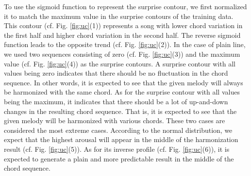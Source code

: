 \documentclass{article}
\begin{document}
To use the sigmoid function to represent the surprise contour, we first normalized it to match the maximum value in the surprise contours of the training data. This contour (cf. Fig. \ref{fig:uc}(1)) represents a song with lower chord variation in the first half and higher chord variation in the second half. The reverse sigmoid function leads to the opposite trend (cf. Fig. \ref{fig:uc}(2)). In the case of plain line, we used two sequences consisting of zero (cf. Fig. \ref{fig:uc}(3)) and the maximum value (cf. Fig. \ref{fig:uc}(4)) as the surprise contours. A surprise contour with all values being zero indicates that there should be no fluctuation in the chord sequence. In other words, it is expected to see that the given melody will always be harmonized with the same chord. As for the surprise contour with all values being the maximum, it indicates that there should be a lot of up-and-down changes in the resulting chord sequence. That is, it is expected to see that the given melody will be harmonized with various chords. These two cases are considered the most extreme cases. According to the normal distribution, we expect that the highest arousal will appear in the middle of the harmonization result (cf. Fig. \ref{fig:uc}(5)). As for its inverse profile (cf. Fig. \ref{fig:uc}(6)), it is expected to generate a plain and more predictable result in the middle of the chord sequence.
\end{document}

